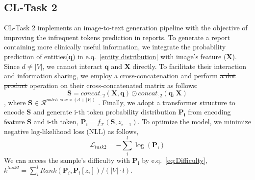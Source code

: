 \documentclass[sn-mathphys-num]{sn-jnl}%
\theoremstyle{thmstyleone}%
\theoremstyle{thmstyletwo}%
\theoremstyle{thmstylethree}%
\begin{document}
\subsection{CL-Task 2}
CL-Task 2 implements an image-to-text generation pipeline with the objective of improving the infrequent tokens prediction in reports.
To generate a report containing more clinically useful information, we integrate the probability prediction of entities($\mathbf{q}$) in e.q.~\ref{entity distribution} with image's feature ($\mathbf{X}$).
Since $d \neq |V|$, we cannot interact $\mathbf{q}$ and $\mathbf{X}$ directly. To facilitate their interaction and information sharing, we employ a cross-concatenation and perform \sout{a dot product} operation on their cross-concatenated matrix as follows:
\begin{equation*}
     \mathbf{S} = concat_{:2}(\mathbf{X}, \mathbf{q}) \odot concat_{:2}(\mathbf{q}, \mathbf{X})
\end{equation*}, where $\mathbf{S} \in \mathcal{R}^{patch\_size \times (d + |V|)}$ . 
Finally, we adopt a transformer structure to encode $\mathbf{S}$ and generate i-th token probability distribution $\mathbf{P_{i}}$ from encoding feature $\mathbf{S}$ and i-th token, $\mathbf{{P}_{i}}  =  f_{{\mathcal{T}}}(\mathbf{S}, z_{i-1})$.
To optimize the model,  we minimize negative log-likelihood loss (NLL) as follows,
\begin{equation}
    \mathcal{L}_{task2} =  -\sum_{i}^{l} \log \left(\mathbf{P_{i}}\right) 
\end{equation}
We can access the sample's difficulty with $\mathbf{P_{i}}$ by e.q.~\ref{eq:Difficulty}, 
 $k^{task2} = \sum_{i}^{l} Rank(\mathbf{P}_{i},\mathbf{P}_{i}[z_{i}])/( |V| \cdot l) $.
 
\end{document}
